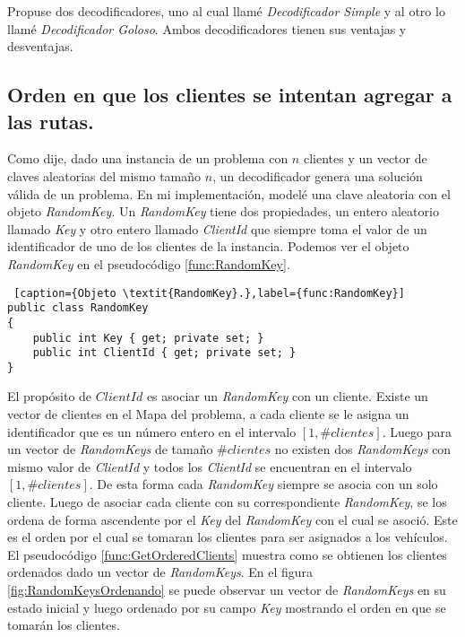\bigskip

Propuse dos decodificadores, uno al cual llamé \textit{Decodificador Simple} y al otro lo llamé \textit{Decodificador Goloso}. Ambos decodificadores tienen sus ventajas y desventajas.

\subsection{Orden en que los clientes se intentan agregar a las rutas.}\label{sec:ordenDeco}

Como dije, dado una instancia de un problema con $n$ clientes y un vector de claves aleatorias del mismo tamaño $n$, un decodificador genera una solución válida de un problema. En mi implementación, modelé una clave aleatoria con el objeto \textit{RandomKey}. Un \textit{RandomKey} tiene dos propiedades, un entero aleatorio llamado \textit{Key} y otro entero llamado \textit{ClientId} que siempre toma el valor de un identificador de uno de los clientes de la instancia. Podemos ver el objeto \textit{RandomKey} en el pseudocódigo \ref{func:RandomKey}.

\bigskip

\begin{lstlisting} [caption={Objeto \textit{RandomKey}.},label={func:RandomKey}]
public class RandomKey
{        
	public int Key { get; private set; }
	public int ClientId { get; private set; }
}
\end{lstlisting}

\bigskip

El propósito de $ClientId$ es asociar un \textit{RandomKey} con un cliente. Existe un vector de clientes en el Mapa del problema, a cada cliente se le asigna un identificador que es un número entero en el intervalo $[1, \#clientes]$. Luego para un vector de \textit{RandomKeys} de tamaño $\#clientes$ no existen dos \textit{RandomKeys} con mismo valor de \textit{ClientId} y todos los \textit{ClientId} se encuentran en el intervalo $[1, \#clientes]$. De esta forma cada \textit{RandomKey} siempre se asocia con un solo cliente. Luego de asociar cada cliente con su correspondiente \textit{RandomKey}, se los ordena de forma ascendente por el \textit{Key} del \textit{RandomKey} con el cual se asoció. Este es el orden por el cual se tomaran los clientes para ser asignados a los vehículos. El pseudocódigo \ref{func:GetOrderedClients} muestra como se obtienen los clientes ordenados dado un vector de \textit{RandomKeys}. En el figura \ref{fig:RandomKeysOrdenando} se puede observar un vector de \textit{RandomKeys} en su estado inicial y luego ordenado por su campo \textit{Key} mostrando el orden en que se tomarán los clientes.

